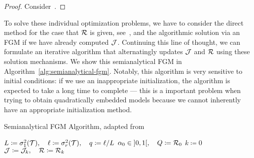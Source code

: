 \begin{proof}
    Consider~\cite[Lemma~2.1]{Deng2003}.
\end{proof}

To solve these individual optimization problems, we have to consider the direct method for the case that $\mathcal{R}$ is given, see~\cite[Theorem~3.4]{Morandin2023}, and the algorithmic solution via an \ac{FGM} if we have already computed $\mathcal{J}$.
Continuing this line of thought, we can formulate an iterative algorithm that alternatingly updates $\mathcal{J}$ and $\mathcal{R}$ using these solution mechanisms.
We show this semianalytical \ac{FGM} in Algorithm~\ref{alg:semianalytical-fgm}.
Notably, this algorithm is very sensitive to initial conditions: if we use an inappropriate initialization, the algorithm is expected to take a long time to complete --- this is a important problem when trying to obtain quadratically embedded models because we cannot inherently have an appropriate initialization method.

\begin{algorithm}
    \caption{Semianalytical \ac{FGM} Algorithm, adapted from~\cite[Algorithm~1]{Morandin2023}}\label{alg:semianalytical-fgm}
    $L \coloneqq \sigma_1^2(\mathcal{T}),\quad \ell \coloneqq \sigma_r^2(\mathcal{T}),\quad q \coloneqq \ell / L$\;
    $\alpha_0 \in \interval[open]{0}{1},\quad Q \coloneqq \mcl{R}_0$\;
    $k \coloneqq 0$\;
    $\mathcal{J} \coloneqq \mathcal{J}_k,\quad \mathcal{R} \coloneqq \mathcal{R}_k$\;
\end{algorithm}

